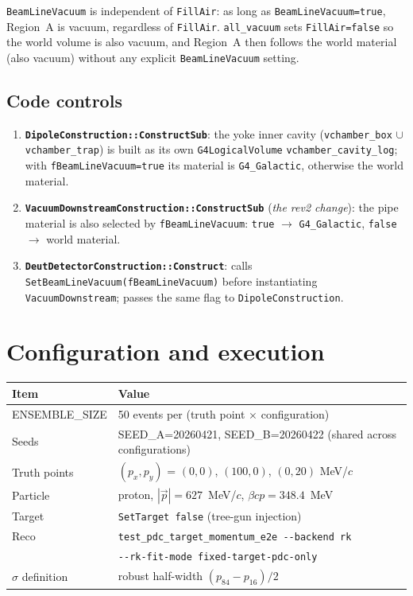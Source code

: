 \documentclass[a4paper, 11pt]{article}
\begin{document}
\texttt{BeamLineVacuum} is independent of \texttt{FillAir}: as long as \texttt{BeamLineVacuum=true}, Region~A is vacuum, regardless of \texttt{FillAir}. \texttt{all\_vacuum} sets \texttt{FillAir=false} so the world volume is also vacuum, and Region~A then follows the world material (also vacuum) without any explicit \texttt{BeamLineVacuum} setting.

\subsection{Code controls}

\begin{enumerate}[nosep]
  \item \textbf{\texttt{DipoleConstruction::ConstructSub}}: the yoke inner cavity (\texttt{vchamber\_box} $\cup$ \texttt{vchamber\_trap}) is built as its own \texttt{G4LogicalVolume} \texttt{vchamber\_cavity\_log}; with \texttt{fBeamLineVacuum=true} its material is \texttt{G4\_Galactic}, otherwise the world material.
  \item \textbf{\texttt{VacuumDownstreamConstruction::ConstructSub}} (\emph{the rev2 change}): the pipe material is also selected by \texttt{fBeamLineVacuum}: \texttt{true} $\to$ \texttt{G4\_Galactic}, \texttt{false} $\to$ world material.
  \item \textbf{\texttt{DeutDetectorConstruction::Construct}}: calls \verb|SetBeamLineVacuum(fBeamLineVacuum)| before instantiating \texttt{VacuumDownstream}; passes the same flag to \texttt{DipoleConstruction}.
\end{enumerate}

\section{Configuration and execution}

\begin{center}
\begin{tabular}{ll}
\toprule
Item & Value \\
\midrule
ENSEMBLE\_SIZE              & 50 events per (truth point $\times$ configuration) \\
Seeds                       & SEED\_A=20260421, SEED\_B=20260422 (shared across configurations) \\
Truth points                & $(p_x, p_y)$ = $(0,0)$, $(100,0)$, $(0,20)$ MeV/$c$ \\
Particle                    & proton, $|\vec p|=627$~MeV/$c$, $\beta c p = 348.4$~MeV \\
Target                      & \texttt{SetTarget false} (tree-gun injection) \\
Reco                        & \verb|test_pdc_target_momentum_e2e --backend rk| \\
                            & \verb|--rk-fit-mode fixed-target-pdc-only| \\
$\sigma$ definition         & robust half-width $(p_{84}-p_{16})/2$ \\
\bottomrule
\end{tabular}
\end{center}
\end{document}

